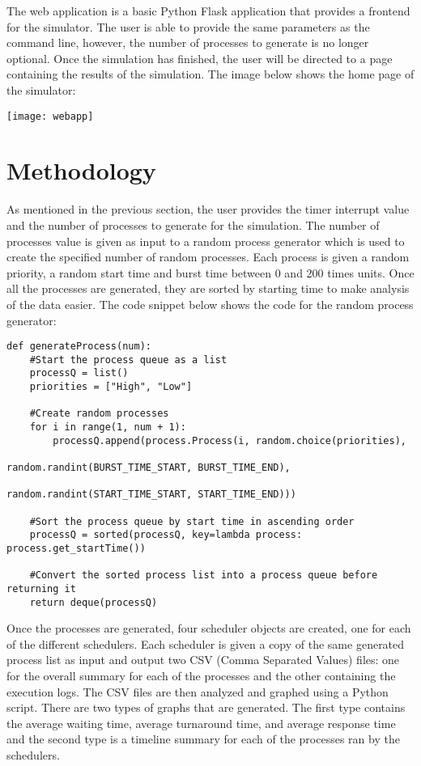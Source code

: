 \documentclass[a4paper]{article}
\begin{document}
The web application is a basic Python Flask application that provides a frontend for the simulator. The user is able to provide the same parameters as the command line, however, the number of processes to generate is no longer optional. Once the simulation has finished, the user will be directed to a page containing the results of the simulation. The image below shows the home page of the simulator:

\begin{center}
\texttt{[image: webapp]}
\end{center}

\section{Methodology}
\label{sec:methods}
As mentioned in the previous section, the user provides the timer interrupt value and the number of processes to generate for the simulation. The number of processes value is given as input to a random process generator which is used to create the specified number of random processes. Each process is given a random priority, a random start time and burst time between 0 and 200 times units. Once all the processes are generated, they are sorted by starting time to make analysis of the data easier. The code snippet below shows the code for the random process generator:

\begin{lstlisting}
def generateProcess(num):
    #Start the process queue as a list
    processQ = list()
    priorities = ["High", "Low"]

    #Create random processes
    for i in range(1, num + 1):
        processQ.append(process.Process(i, random.choice(priorities), 
                                           random.randint(BURST_TIME_START, BURST_TIME_END), 
                                           random.randint(START_TIME_START, START_TIME_END)))

    #Sort the process queue by start time in ascending order
    processQ = sorted(processQ, key=lambda process: process.get_startTime())

    #Convert the sorted process list into a process queue before returning it
    return deque(processQ)
\end{lstlisting}

Once the processes are generated, four scheduler objects are created, one for each of the different schedulers. Each scheduler is given a copy of the same generated process list as input and output two CSV (Comma Separated Values) files: one for the overall summary for each of the processes and the other containing the execution logs. The CSV files are then analyzed and graphed using a Python script. There are two types of graphs that are generated. The first type contains the average waiting time, average turnaround time, and average response time and the second type is a timeline summary for each of the processes ran by the schedulers. 
\end{document}
